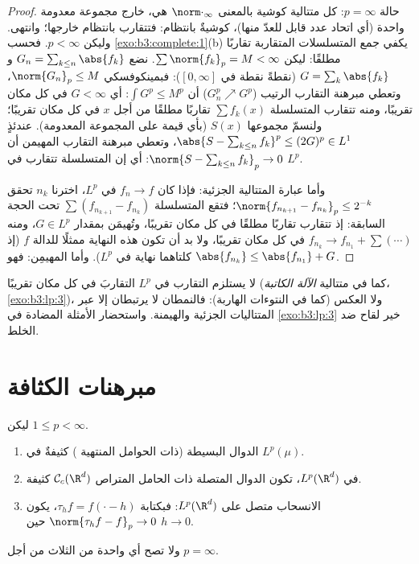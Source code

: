 \begin{proof}
حالة $p = \infty$: كل متتالية كوشية بالمعنى $\norm\cdot_\infty$ هي، خارج
مجموعة معدومة واحدة (أي اتحاد عدد قابل للعدّ منها)، كوشيةٌ بانتظام:
فتتقارب بانتظام خارجها؛ وانتهى. وليكن $p < \infty$. فحسب
\cref{exo:b3:complete:1}(b) يكفي جمع المتسلسلات المتقاربة تقاربًا مطلقًا:
ليكن $\sum\norm{f_k}_p = M < \infty$. نضع $G_n = \sum_{k \leq n}\abs{f_k}$ و $G = \sum_k\abs{f_k}$ (نقطةً نقطة في $[0,\infty]$):
فبمينكوفسكي $\norm{G_n}_p \leq
M$، وتعطي مبرهنة التقارب الرتيب ($G_n^p \nearrow G^p$) أن
$\int G^p \leq M^p$: أي $G < \infty$ في كل مكان تقريبًا، ومنه تتقارب
المتسلسلة $\sum f_k(x)$ تقاربًا مطلقًا من أجل $x$ في كل مكان
تقريبًا؛ ولنسمّ مجموعها $S(x)$ (بأي قيمة على المجموعة المعدومة).
عندئذٍ $\abs{S - \sum_{k\leq n}f_k}^p \leq (2G)^p
\in L^1$، وتعطي مبرهنة التقارب المهيمن أن $\norm{S - \sum_{k\leq n}f_k}_p \to 0$: أي إن
المتسلسلة تتقارب في $L^p$.

وأما عبارة المتتالية الجزئية: فإذا كان $f_n \to f$ في $L^p$،
اخترنا $n_k$ تحقق $\norm{f_{n_{k+1}} - f_{n_k}}_p \leq 2^{-k}$؛ فتقع المتسلسلة $\sum(f_{n_{k+1}} - f_{n_k})$ تحت الحجة
السابقة: إذ تتقارب تقاربًا مطلقًا في كل مكان تقريبًا، وتُهيمَن
بمقدار $G \in
L^p$، ومنه $f_{n_k} \to f_{n_1} + \sum(\cdots)$ في كل مكان تقريبًا، ولا بد أن تكون
هذه النهاية ممثلًا للدالة $f$ (إذ كلتاهما نهاية في $L^p$). وأما
المهيمِن: فهو $\abs{f_{n_k}} \leq \abs{f_{n_1}} + G$.
\end{proof}

\begin{remark}\label{rem:b3:lp:modes}
لا يستلزم التقارب في $L^p$ التقاربَ في كل مكان تقريبًا (كما في
متتالية \emph{الآلة الكاتبة}، \cref{exo:b3:lp:3})، ولا العكس (كما في
النتوءات الهاربة): فالنمطان لا يرتبطان إلا عبر المتتاليات
الجزئية والهيمنة. واستحضار الأمثلة المضادة في \cref{exo:b3:lp:3} خير
لقاح ضد الخلط.
\end{remark}

\section{مبرهنات الكثافة}

\begin{theorem}\label{thm:b3:lp:density}
ليكن $1 \leq p < \infty$.
\begin{enumerate}
  \item الدوال البسيطة (ذات الحوامل المنتهية ) كثيفةٌ
        في $L^p(\mu)$.
  \item في $L^p(\R^d)$، تكون الدوال المتصلة ذات الحامل
        المتراص $\mathcal C_c(\R^d)$ كثيفة.
  \item الانسحاب متصل على $L^p(\R^d)$: فبكتابة
        $\tau_hf = f(\cdot - h)$، يكون $\norm{\tau_hf - f}_p \to 0$
        حين $h \to 0$.
\end{enumerate}
ولا تصح أي واحدة من الثلاث من أجل $p = \infty$.
\end{theorem}

